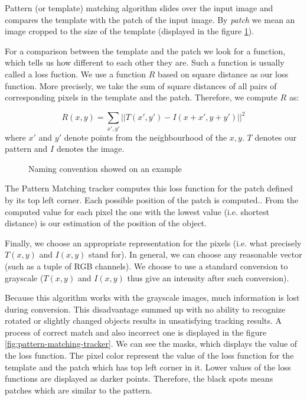 Pattern (or template) matching algorithm slides over the input image and
compares the template with the patch of the input image. By \emph{patch} we
mean an image cropped to the size of the template (displayed in the figure
\ref{fig:patternmatching-naming}).

For a comparison between the template and the patch we look for a function, which
tells us how different to each other they are. Such a function is usually called
a loss fuction. We use a function $R$ based on square distance as our loss
function. More precisely, we take the sum of square distances of all pairs of
corresponding pixels in the template and the patch. Therefore, we compute $R$
as:

$$
R(x, y) =
\sum_{x', y'} ||T(x', y') - I(x + x', y + y')||^2
$$
where $x'$ and $y'$ denote points from the neighbourhood of the $x, y$. $T$
denotes our pattern and $I$ denotes the image. 

\begin{figure}[h]
	\centering
	\def\svgwidth{0.9\linewidth}
	
	\caption{Naming convention showed on an example}
	\label{fig:patternmatching-naming}
\end{figure}

The Pattern Matching tracker computes this loss function for the patch defined
by its top left corner. Each possible position of the patch is computed..
From the computed value for each pixel the one with the lowest value
(i.e. shortest distance) is our estimation of the position of the object.

Finally, we choose an appropriate representation for the pixels (i.e. what
precisely $T(x, y)$ and $I(x, y)$ stand for). In general, we can choose any
reasonable vector (such as a tuple of RGB channels). We choose to use a standard
conversion to grayscale ($T(x, y)$ and $I(x, y)$ thus give an intensity after
such conversion).

Because this algorithm works with the grayscale images, much information is
lost during conversion. This disadvantage summed up with no ability to
recognize rotated or slightly changed objects results in unsatisfying tracking
results. A process of correct match and also incorrect one is displayed in the
figure \ref{fig:pattern-matching-tracker}. We can see the masks, which displays
the value of the loss function. The pixel color represent the value of the loss
function for the template and the patch which has top left corner in it. Lower
values of the loss functions are displayed as darker points. Therefore, the
black spots means patches which are similar to the pattern.

